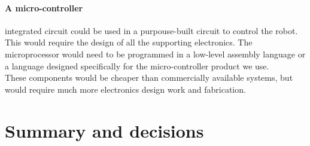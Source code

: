     \paragraph{A micro-controller} integrated circuit could be used in a purpouse-built circuit to control the robot. This would require the design of all the supporting electronics. The microprocessor would need to be programmed in a low-level assembly language or a language designed specifically for the micro-controller product we use.\\
    These components would be cheaper than commercially available systems, but would require much more electronics design work and fabrication.

\section{Summary and decisions}


